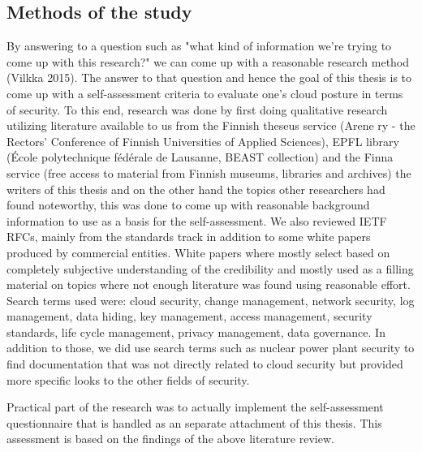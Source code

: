 \documentclass{article}
\begin{document}
\subsection{Methods of the study}
By answering to a question such as "what kind of information we're trying to come up with this research?" we can come up with a reasonable research method (Vilkka 2015).
The answer to that question and hence the goal of this thesis is to come up with a self-assessment criteria to evaluate one's cloud posture in terms of security.
To this end, research was done by first doing qualitative research utilizing literature available to us from the Finnish theseus service (Arene ry - the Rectors' Conference of Finnish Universities of Applied Sciences), EPFL library (École polytechnique fédérale de Lausanne, BEAST collection) and the Finna service (free access to material from Finnish museums, libraries and archives) the writers of this thesis and on the other hand the topics other researchers had found noteworthy, this was done to come up with reasonable background information to use as a basis for the self-assessment. We also reviewed IETF RFCs, mainly from the standards track in addition to some white papers produced by commercial entities. White papers where mostly select based on completely subjective understanding of the credibility and mostly used as a filling material on topics where not enough literature was found using reasonable effort. Search terms used were: cloud security, change management, network security, log management, data hiding, key management, access management, security standards, life cycle management, privacy management, data governance. In addition to those, we did use search terms such as nuclear power plant security to find documentation that was not directly related to cloud security but provided more specific looks to the other fields of security.
\par
Practical part of the research was to actually implement the self-assessment questionnaire that is handled as an separate attachment of this thesis. This assessment is based on the findings of the above literature review.
\end{document}
